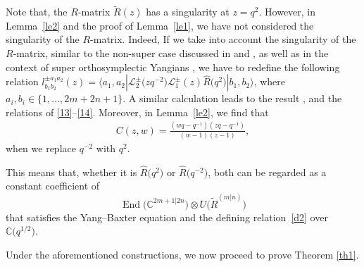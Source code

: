 \documentclass[10pt,a4paper]{amsart}
\numberwithin{equation}{section}
\begin{document}
\begin{Remark}Note that, the $R$-matrix $\widetilde{R}(z)$ has a singularity at $z=q^{2}$. However, in Lemma~\ref{le2} and the proof of Lemma~\ref{le1}, we have not considered the singularity of the $R$-matrix. Indeed, If we take into account the singularity of the $R$-matrix, similar to the non-super case discussed in \cite{JMA} and \cite{JMAB}, as well as in the context of super orthosymplectic Yangians \cite{AIM}, we have to redefine the following relation
$l^{\pm a_1a_2}_{b_1b_2}(z)=\langle a_1, a_2|\mathcal{L}_2^{\pm}\bigl(zq^{-2}\bigr)\mathcal{L}_1^{\pm}(z)\widehat{R}\bigl(q^{2}\bigr)|b_1, b_2\rangle$,
where $a_i, b_i\in\{1,\dots,2m+2n+1\}$. A similar calculation leads to the result
,
and the relations of \eqref{13}--\eqref{14}. Moreover, in Lemma~\ref{le2}, we find that
\begin{gather*}
 C(z,w)
=\frac{(wq-q^{-1})(zq-q^{-1})}{(w-1)(z-1)},
\end{gather*}when we replace $q^{-2}$ with $q^2$.

This means that, whether it is $\widehat{R}\bigl(q^{2}\bigr)$ or $\widehat{R}\bigl(q^{-2}\bigr)$, both can be regarded as a constant coefficient of \[\operatorname{End}\bigl(\mathbb{C}^{2m+1|2n}\bigr)\otimes U\bigl(\widetilde{R}^{(m|n)}\bigr)\] that satisfies the Yang--Baxter equation and the defining relation~\eqref{d2} over~$\mathbb{C}\bigl(q^{1/2}\bigr)$.
\end{Remark}



Under the aforementioned constructions, we now proceed to prove Theorem \ref{th1}.
\end{document}
